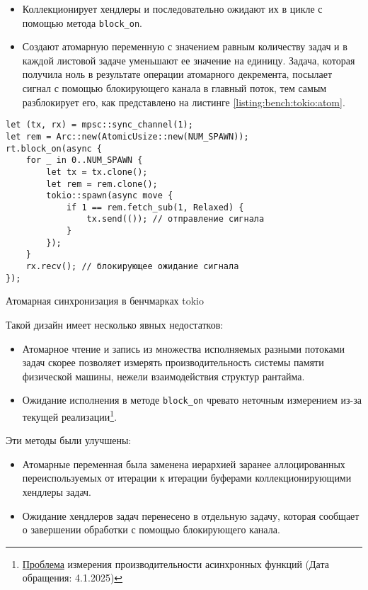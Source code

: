 \begin{itemize}
    \item Коллекционирует хендлеры и последовательно ожидают их в цикле с помощью метода \verb|block_on|.
    \item Создают атомарную переменную с значением равным количеству задач и в каждой листовой задаче уменьшают ее значение на единицу. Задача, которая получила ноль в результате операции атомарного декремента, посылает сигнал с помощью блокирующего канала в главный поток, тем самым разблокирует его, как представлено на листинге \ref{listing:bench:tokio:atom}.
\end{itemize}

\begin{listing}[H]
    \begin{verbatim}
let (tx, rx) = mpsc::sync_channel(1);
let rem = Arc::new(AtomicUsize::new(NUM_SPAWN));
rt.block_on(async {
    for _ in 0..NUM_SPAWN {
        let tx = tx.clone();
        let rem = rem.clone();
        tokio::spawn(async move {
            if 1 == rem.fetch_sub(1, Relaxed) {
                tx.send(()); // отправление сигнала
            }
        });
    }
    rx.recv(); // блокирующее ожидание сигнала
});
    \end{verbatim}

    \caption{Атомарная синхронизация в бенчмарках tokio}
    \label{listing:bench:tokio:atom}
\end{listing}

Такой дизайн имеет несколько явных недостатков:

\begin{itemize}
    \item Атомарное чтение и запись из множества исполняемых разными потоками задач скорее позволяет измерять производительность системы памяти физической машины, нежели взаимодействия структур рантайма.
    \item Ожидание исполнения в методе \verb|block_on| чревато неточным измерением из-за текущей реализации\footnote{\href{https://github.com/bheisler/criterion.rs/issues/819}{Проблема} измерения производительности асинхронных функций (Дата обращения: 4.1.2025)}.
\end{itemize}

Эти методы были улучшены:

\begin{itemize}
    \item Атомарные переменная была заменена иерархией заранее аллоцированных переиспользуемых от итерации к итерации буферами коллекционирующими хендлеры задач.
    \item Ожидание хендлеров задач перенесено в отдельную задачу, которая сообщает о завершении обработки с помощью блокирующего канала.
\end{itemize}

